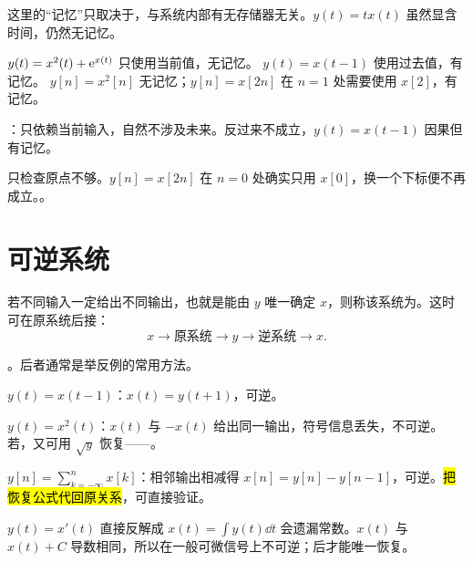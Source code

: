 这里的“记忆”只取决于，与系统内部有无存储器无关。$y(t)=t x(t)$ 虽然显含时间，仍然无记忆。

\begin{example}[逐点运算与延迟]
  $y(t)=x^2(t)+\mathrm{e}^{x(t)}$ 只使用当前值，无记忆。
  $y(t)=x(t-1)$ 使用过去值，有记忆。
  $y[n]=x^2[n]$ 无记忆；$y[n]=x[2n]$ 在 $n=1$ 处需要使用 $x[2]$，有记忆。
\end{example}

：只依赖当前输入，自然不涉及未来。反过来不成立，$y(t)=x(t-1)$ 因果但有记忆。

只检查原点不够。$y[n]=x[2n]$ 在 $n=0$ 处确实只用 $x[0]$，换一个下标便不再成立。。

\section{可逆系统}
\label{sec:invertible-systems}

\begin{definition}[可逆系统]
  \label{def:invertible-system}
  若不同输入一定给出不同输出，也就是能由 $y$ 唯一确定 $x$，则称该系统为。这时可在原系统后接：
  \begin{equation}
    x\longrightarrow\boxed{\text{原系统}}\longrightarrow y
    \longrightarrow\boxed{\text{逆系统}}\longrightarrow x.
    \label{eq:inverse-system}
  \end{equation}
\end{definition}

。后者通常是举反例的常用方法。

\begin{example}[延迟、平方、累加]
  $y(t)=x(t-1)$：$x(t)=y(t+1)$，可逆。

  $y(t)=x^2(t)$：$x(t)$ 与 $-x(t)$ 给出同一输出，符号信息丢失，不可逆。若，又可用 $\sqrt{y}$ 恢复——。

  $y[n]=\sum_{k=-\infty}^{n}x[k]$：相邻输出相减得 $x[n]=y[n]-y[n-1]$，可逆。\hl{把恢复公式代回原关系}，可直接验证。
\end{example}

\begin{pitfall}[积分常数]
  $y(t)=x'(t)$ 直接反解成 $x(t)=\int y(t)\dd t$ 会遗漏常数。$x(t)$ 与 $x(t)+C$ 导数相同，所以在一般可微信号上不可逆；后才能唯一恢复。
\end{pitfall}

